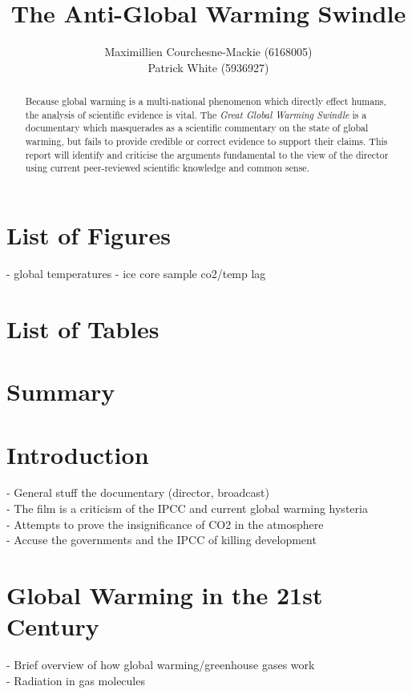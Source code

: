 \documentclass[12pt]{article}
\title{The Anti-Global Warming Swindle}
\author{Maximillien Courchesne-Mackie (6168005) \\
             Patrick White (5936927)}
\date{}
\begin{document}
\maketitle
\newpage

\begin{abstract}
    Because global warming is a multi-national phenomenon which directly effect humans, the analysis                                  of scientific evidence is vital. The \textit{Great Global Warming Swindle} is a documentary which masquerades as a scientific commentary on the state of global warming, but fails to provide credible or correct evidence to support their claims. This report will identify and criticise the arguments fundamental to the view of the director using current peer-reviewed scientific knowledge and common sense.
\end{abstract}
\newpage

\tableofcontents
\newpage

\section*{List of Figures}
    - global temperatures
    - ice core sample co2/temp lag
\section*{List of Tables}
\newpage

\section*{Summary}
\newpage

\section{Introduction}
	- General stuff the documentary (director, broadcast) \\
	- The film is a criticism of the IPCC and current global warming hysteria \\
	- Attempts to prove the insignificance of CO2 in the atmosphere \\
	- Accuse the governments and the IPCC of killing development \\
\section{Global Warming in the 21st Century}
	- Brief overview of how global warming/greenhouse gases work\\
	- Radiation in gas molecules\\
\end{document}
